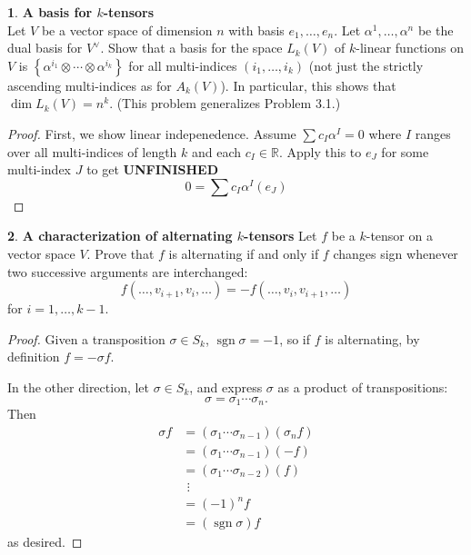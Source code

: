 \documentclass[12pt]{article}
\DeclareMathOperator{\sgn}{sgn}
\theoremstyle{definition}
\newtheorem{ex}{}[section]
\begin{document}
\begin{ex}
	\textbf{A basis for $k$-tensors} \\
	Let $V$ be a vector space of dimension $n$ with basis $e_1, \dots, e_n$.
	Let $\alpha^1, \dots, \alpha^n$ be the dual basis for $V^\vee$.
	Show that a basis for the space $L_k(V)$ of $k$-linear functions on $V$ is $\left\lbrace \alpha^{i_1} \otimes \cdots \otimes \alpha^{i_k} \right\rbrace$ for all multi-indices $(i_1, \dots, i_k)$ (not just the strictly ascending multi-indices as for $A_k(V)$).
	In particular, this shows that $\dim L_k(V) = n^k$.
	(This problem generalizes Problem 3.1.)
\end{ex}
\begin{proof}
	First, we show linear indepenedence.
	Assume $\sum c_I\alpha^I = 0$ where $I$ ranges over all multi-indices of length $k$ and each $c_I \in \mathbb{R}$.
	Apply this to $e_J$ for some multi-index $J$ to get \textbf{UNFINISHED} \begin{equation*}
		0 = \sum c_I\alpha^I(e_J)
	\end{equation*}
\end{proof}

\begin{ex}
	\textbf{A characterization of alternating $k$-tensors}
	Let $f$ be a $k$-tensor on a vector space $V$.
	Prove that $f$ is alternating if and only if $f$ changes sign whenever two successive arguments are interchanged:
	\begin{equation*}
		f(\dots, v_{i + 1}, v_i, \dots) = -f(\dots, v_i, v_{i + 1}, \dots)
	\end{equation*}
	for $i = 1, \dots, k - 1$.
\end{ex}
\begin{proof}
	Given a transposition $\sigma \in S_k$, $\sgn \sigma = -1$, so if $f$ is alternating, by definition $f = - \sigma f$.

	In the other direction, let $\sigma \in S_k$, and express $\sigma$ as a product of transpositions: \begin{equation*}
		\sigma = \sigma_1\cdots\sigma_n.
	\end{equation*}
	Then \begin{align*}
		\sigma f & = (\sigma_1\cdots\sigma_{n-1})(\sigma_nf) \\
		         & = (\sigma_1\cdots\sigma_{n-1})(-f)        \\
		         & = (\sigma_1\cdots\sigma_{n-2})(f)         \\
		         & \ \,\vdots                                \\
		         & = (-1)^n f                                \\
		         & = (\sgn \sigma) f
	\end{align*}
	as desired.
\end{proof}
\end{document}
